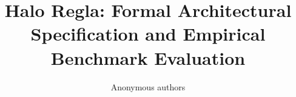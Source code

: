 \title{\textbf{Halo Regla: Formal Architectural Specification and Empirical Benchmark Evaluation}}

\author{Anonymous authors}

